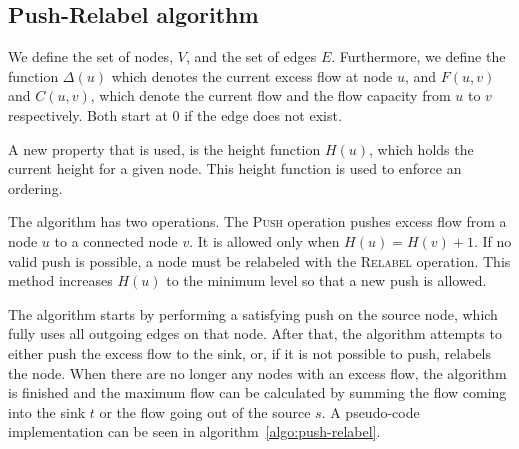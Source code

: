\documentclass[10pt,a4paper,hidelinks]{article}
\begin{document}
\subsection{Push-Relabel algorithm}

We define the set of nodes, $V$, and the set of edges $E$. Furthermore, we define the function $\Delta(u)$ which denotes the current excess flow at node $u$, and $F(u, v)$ and $C(u, v)$, which denote the current flow and the flow capacity from $u$ to $v$ respectively. Both start at $0$ if the edge does not exist.

A new property that is used, is the height function $H(u)$, which holds the current height for a given node. This height function is used to enforce an ordering.

The algorithm has two operations. The \textsc{Push} operation pushes excess flow from a node $u$ to a connected node $v$. It is allowed only when $H(u) = H(v) + 1$. If no valid push is possible, a node must be relabeled with the \textsc{Relabel} operation. This method increases $H(u)$ to the minimum level so that a new push is allowed.

The algorithm starts by performing a satisfying push on the source node, which fully uses all outgoing edges on that node. After that, the algorithm attempts to either push the excess flow to the sink, or, if it is not possible to push, relabels the node. When there are no longer any nodes with an excess flow, the algorithm is finished and the maximum flow can be calculated by summing the flow coming into the sink $t$ or the flow going out of the source $s$. A pseudo-code implementation can be seen in algorithm~\ref{algo:push-relabel}.
\end{document}
